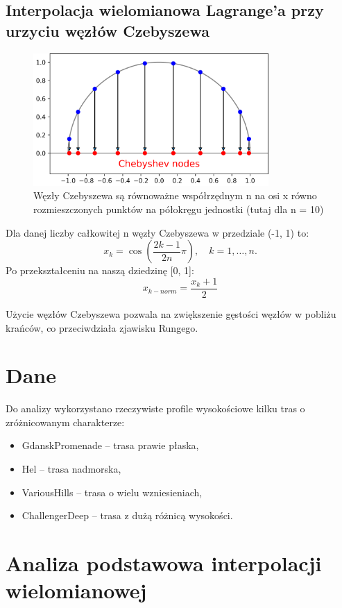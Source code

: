 \documentclass[11pt,a4paper]{article}
\begin{document}
\subsection{Interpolacja wielomianowa Lagrange'a przy urzyciu węzłów Czebyszewa}
\begin{figure}[H]
    \centering
    \includegraphics[width=0.8\textwidth]{chebyshev_circle.png}
    \caption{Węzły Czebyszewa są równoważne współrzędnym n na osi x równo rozmieszczonych punktów na półokręgu jednostki (tutaj dla n = 10)}
    \label{fig:chebyshev_circle}
\end{figure}
Dla danej liczby całkowitej n węzły Czebyszewa w przedziale (-1, 1) to:
\[
x_k = \cos\left( \frac{2k-1}{2n} \pi \right), \quad k = 1, \ldots, n.
\]
Po przekształceniu na naszą dziedzinę [0, 1]:
\[
x_{k-norm} = \frac{x_k + 1}{2}
\]

Użycie węzłów Czebyszewa pozwala na zwiększenie gęstości węzłów w pobliżu krańców, co przeciwdziała zjawisku Rungego.

\section{Dane}
Do analizy wykorzystano rzeczywiste profile wysokościowe kilku tras o zróżnicowanym charakterze:
\begin{itemize}
    \item GdanskPromenade -- trasa prawie płaska,
    \item Hel -- trasa nadmorska,
    \item VariousHills -- trasa o wielu wzniesieniach,
    \item ChallengerDeep -- trasa z dużą różnicą wysokości.
\end{itemize}

\section{Analiza podstawowa interpolacji wielomianowej}
\end{document}
